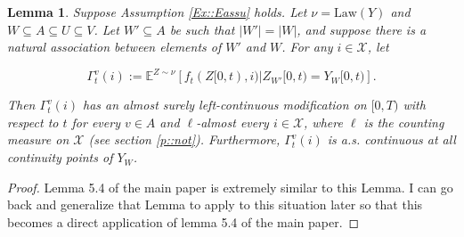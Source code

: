 \documentclass[12pt]{article}
\newcommand{\mb}{\mathbb}
\newcommand{\mc}{\mathcal}
\newcommand{\te}{\text}
\newcommand{\exmu}[2]{\mb{E}^{#1}\left[#2\right]}	%
\newcommand{\defeq}{:=}								%
\newcommand{\sta}{\mc{X}}							%
\newcommand{\vind}[1]{_{#1}}						%
\newcommand{\tmi}[1]{#1}							%
\newcommand{\vpara}[1]{^{#1}}						%
\newcommand{\tpara}[1]{_{#1}}						%
\newcommand{\Xg}{Y}									%
\newcommand{\ratee}{\Gamma}							%
\newcommand{\mm}{\nu}								%
\newcommand{\law}{\te{Law}}							%
\newcommand{\Xh}{Z}									%
\newtheorem{lem}[thms]{Lemma}
\begin{document}
\begin{lem}
Suppose Assumption \ref{Ex::Eassu} holds. Let \(\mm = \law(\Xg)\) and \(W\subseteq A \subseteq U\subseteq V\). Let \(W'\subseteq A\) be such that \(|W'| = |W|\), and suppose there is a natural association between elements of \(W'\) and \(W\). For any \(i \in \sta\), let

\[\ratee\vpara{v}\tpara{t}(i) \defeq \exmu{\Xh\sim \mm}{f_t(\Xh\tmi{[0,t)},i)|\Xh\vind{W'}\tmi{[0,t)} = \Xg\vind{W}\tmi{[0,t)}}.\]

Then \(\ratee\vpara{v}\tpara{t}(i)\) has an almost surely left-continuous modification on \([0,T)\) with respect to \(t\) for every \(v \in A\) and \(\ell\)-almost every \(i \in \sta\), where \(\ell\) is the counting measure on \(\sta\) (see section \ref{p::not}). Furthermore, \(\ratee\vpara{v}\tpara{t}(i)\) is a.s. continuous at all continuity points of \(\Xg\vind{W}\).
\label{Ex::leftmod}
\end{lem}
\begin{proof}
Lemma 5.4 of the main paper is extremely similar to this Lemma. I can go back and generalize that Lemma to apply to this situation later so that this becomes a direct application of lemma 5.4 of the main paper.
\end{proof}
\end{document}
